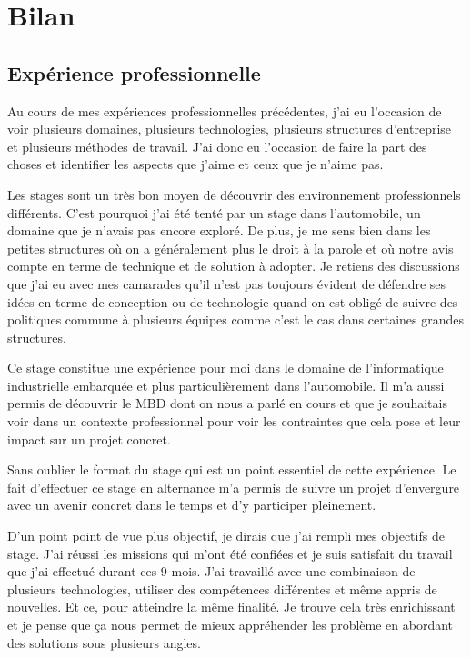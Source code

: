 \chapter{Bilan}

\section*{Expérience professionnelle}
Au cours de mes expériences professionnelles précédentes, j'ai eu l'occasion de
voir plusieurs domaines, plusieurs technologies, plusieurs structures
d'entreprise et plusieurs méthodes de travail. J'ai donc eu l'occasion de faire
la part des choses et identifier les aspects que j'aime et ceux que je n'aime
pas.

Les stages sont un très bon moyen de découvrir des environnement professionnels
différents. C'est pourquoi j'ai été tenté par un stage dans l'automobile, un
domaine que je n'avais pas encore exploré. De plus, je me sens bien dans les
petites structures où on a généralement plus le droit à la parole et où notre
avis compte en terme de technique et de solution à adopter. Je retiens des
discussions que j'ai eu avec mes camarades qu'il n'est pas toujours évident de
défendre ses idées en terme de conception ou de technologie quand on est obligé
de suivre des politiques commune à plusieurs équipes comme c'est le cas dans
certaines grandes structures.

Ce stage constitue une expérience pour moi dans le domaine de l'informatique
industrielle embarquée et plus particulièrement dans l'automobile. Il m'a aussi
permis de découvrir le MBD dont on nous a parlé en cours et que je souhaitais
voir dans un contexte professionnel pour voir les contraintes que cela pose et
leur impact sur un projet concret.

Sans oublier le format du stage qui est un point essentiel de cette expérience.
Le fait d'effectuer ce stage en alternance m'a permis de suivre un projet
d'envergure avec un avenir concret dans le temps et d'y participer pleinement.

D'un point point de vue plus objectif, je dirais que j'ai rempli mes objectifs
de stage.  J'ai réussi les missions qui m'ont été confiées et je suis satisfait
du travail que j'ai effectué durant ces 9 mois.  J'ai travaillé avec une
combinaison de plusieurs technologies, utiliser des compétences différentes et
même appris de nouvelles. Et ce, pour atteindre la même finalité. Je trouve cela
très enrichissant et je pense que ça nous permet de mieux appréhender les
problème en abordant des solutions sous plusieurs angles.

